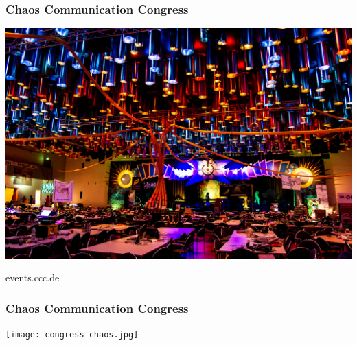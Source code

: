 \documentclass[12pt]{beamer}
\begin{document}
	\begin{frame}
		\frametitle{Chaos Communication Congress}
		\begin{center}
			\includegraphics[height=0.2\textheight]{img//congress_flickr_Willi_Thiel_cc_by-nc-sa_2.0.jpg}
			\vspace{20pt}		
			
			events.ccc.de
		\end{center}
		\end{frame}
		\begin{frame}
			\frametitle{Chaos Communication Congress}
			\begin{center}
				\texttt{[image: congress-chaos.jpg]}
			\end{center}
	\end{frame}	
		
\end{document}
